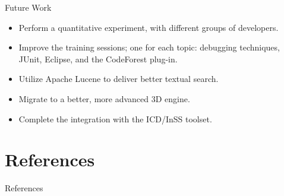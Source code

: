 \documentclass[handout]{beamer}
\begin{document}
\begin{frame}{Future Work}
    \begin{itemize}
        \item Perform a quantitative experiment, with different groups of
        developers.
        \item Improve the training sessions; one for each topic: debugging
        techniques, JUnit, Eclipse, and the CodeForest plug-in.
        \item Utilize Apache Lucene to deliver better textual search.
        \item Migrate to a better, more advanced 3D engine.
        \item Complete the integration with the ICD/InSS toolset.
    \end{itemize}
\end{frame}

\section{References}

\begin{frame}
    \sectionpage
\end{frame}

\begin{frame}[allowframebreaks]{References}


\end{frame}
\end{document}
